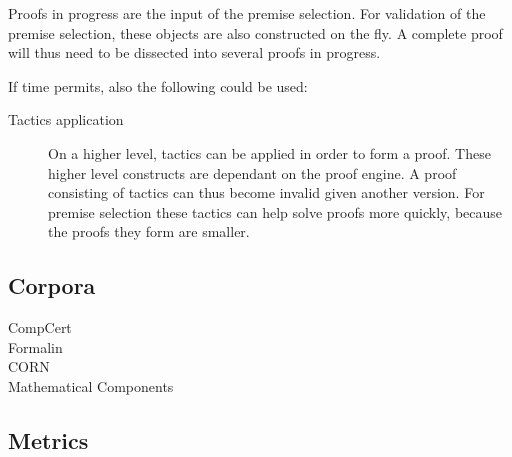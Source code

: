 Proofs in progress are the input of the premise selection.
For validation of the premise selection, these objects are also constructed on the fly.
A complete proof will thus need to be dissected into several proofs in progress.

If time permits, also the following could be used:
\begin{description}
    \item[Tactics application]
        On a higher level, tactics can be applied in order to form a proof.
        These higher level constructs are dependant on the proof engine.
        A proof consisting of tactics can thus become invalid given another \coq version.
        For premise selection these tactics can help solve proofs more quickly, because the proofs they form are smaller.
\end{description}

\subsection{Corpora}
\begin{description}
    \item[CompCert]
    \item[Formalin]
    \item[CORN]
    \item[Mathematical Components]
\end{description}

\subsection{Metrics}

